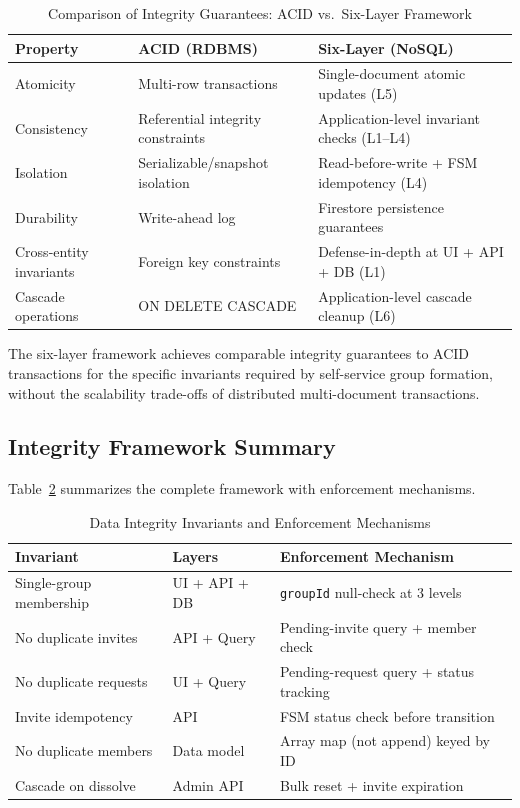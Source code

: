\documentclass[11pt,a4paper]{article}
\theoremstyle{plain}
\theoremstyle{definition}
\begin{document}
\begin{table}[htbp]
\centering
\caption{Comparison of Integrity Guarantees: ACID vs.\ Six-Layer Framework}
\label{tab:acid}
\small
\renewcommand{\arraystretch}{1.15}
\begin{tabular}{@{}p{2.5cm}p{3.5cm}p{3.5cm}@{}}
\toprule
\textbf{Property} & \textbf{ACID (RDBMS)} & \textbf{Six-Layer (NoSQL)} \\
\midrule
Atomicity & Multi-row transactions & Single-document atomic updates (L5) \\
Consistency & Referential integrity constraints & Application-level invariant checks (L1--L4) \\
Isolation & Serializable/snapshot isolation & Read-before-write + FSM idempotency (L4) \\
Durability & Write-ahead log & Firestore persistence guarantees \\
\midrule
Cross-entity invariants & Foreign key constraints & Defense-in-depth at UI + API + DB (L1) \\
Cascade operations & ON DELETE CASCADE & Application-level cascade cleanup (L6) \\
\bottomrule
\end{tabular}
\end{table}

The six-layer framework achieves comparable integrity guarantees to ACID transactions for the specific invariants required by self-service group formation, without the scalability trade-offs of distributed multi-document transactions.

\subsection{Integrity Framework Summary}

Table~\ref{tab:duplication} summarizes the complete framework with enforcement mechanisms.

\begin{table}[htbp]
\centering
\caption{Data Integrity Invariants and Enforcement Mechanisms}
\label{tab:duplication}
\small
\renewcommand{\arraystretch}{1.15}
\begin{tabular}{@{}p{3cm}p{2cm}p{4.5cm}@{}}
\toprule
\textbf{Invariant} & \textbf{Layers} & \textbf{Enforcement Mechanism} \\
\midrule
Single-group membership & UI + API + DB & \texttt{groupId} null-check at 3 levels \\
No duplicate invites & API + Query & Pending-invite query + member check \\
No duplicate requests & UI + Query & Pending-request query + status tracking \\
Invite idempotency & API & FSM status check before transition \\
No duplicate members & Data model & Array map (not append) keyed by ID \\
Cascade on dissolve & Admin API & Bulk reset + invite expiration \\
\bottomrule
\end{tabular}
\end{table}
\end{document}
